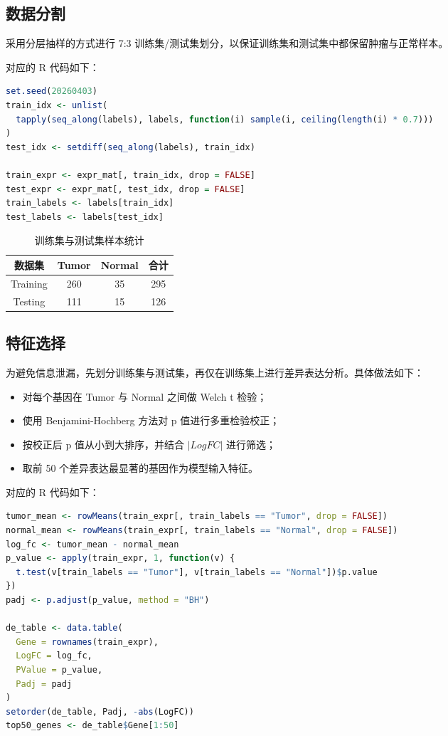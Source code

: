 \documentclass[12pt,fontset=fandol]{ctexart}
\begin{document}
\subsection{数据分割}
采用分层抽样的方式进行 7:3 训练集/测试集划分，以保证训练集和测试集中都保留肿瘤与正常样本。

对应的 R 代码如下：
\begin{lstlisting}[language=R]
set.seed(20260403)
train_idx <- unlist(
  tapply(seq_along(labels), labels, function(i) sample(i, ceiling(length(i) * 0.7)))
)
test_idx <- setdiff(seq_along(labels), train_idx)

train_expr <- expr_mat[, train_idx, drop = FALSE]
test_expr <- expr_mat[, test_idx, drop = FALSE]
train_labels <- labels[train_idx]
test_labels <- labels[test_idx]
\end{lstlisting}

\begin{table}[H]
\centering
\caption{训练集与测试集样本统计}
\begin{tabular}{cccc}
\toprule
数据集 & Tumor & Normal & 合计 \\
\midrule
Training & 260 & 35 & 295 \\
Testing & 111 & 15 & 126 \\
\bottomrule
\end{tabular}
\end{table}

\subsection{特征选择}
为避免信息泄漏，先划分训练集与测试集，再仅在训练集上进行差异表达分析。具体做法如下：
\begin{itemize}
  \item 对每个基因在 Tumor 与 Normal 之间做 Welch t 检验；
  \item 使用 Benjamini-Hochberg 方法对 p 值进行多重检验校正；
  \item 按校正后 p 值从小到大排序，并结合 $|LogFC|$ 进行筛选；
  \item 取前 50 个差异表达最显著的基因作为模型输入特征。
\end{itemize}

对应的 R 代码如下：
\begin{lstlisting}[language=R]
tumor_mean <- rowMeans(train_expr[, train_labels == "Tumor", drop = FALSE])
normal_mean <- rowMeans(train_expr[, train_labels == "Normal", drop = FALSE])
log_fc <- tumor_mean - normal_mean
p_value <- apply(train_expr, 1, function(v) {
  t.test(v[train_labels == "Tumor"], v[train_labels == "Normal"])$p.value
})
padj <- p.adjust(p_value, method = "BH")

de_table <- data.table(
  Gene = rownames(train_expr),
  LogFC = log_fc,
  PValue = p_value,
  Padj = padj
)
setorder(de_table, Padj, -abs(LogFC))
top50_genes <- de_table$Gene[1:50]
\end{lstlisting}
\end{document}
